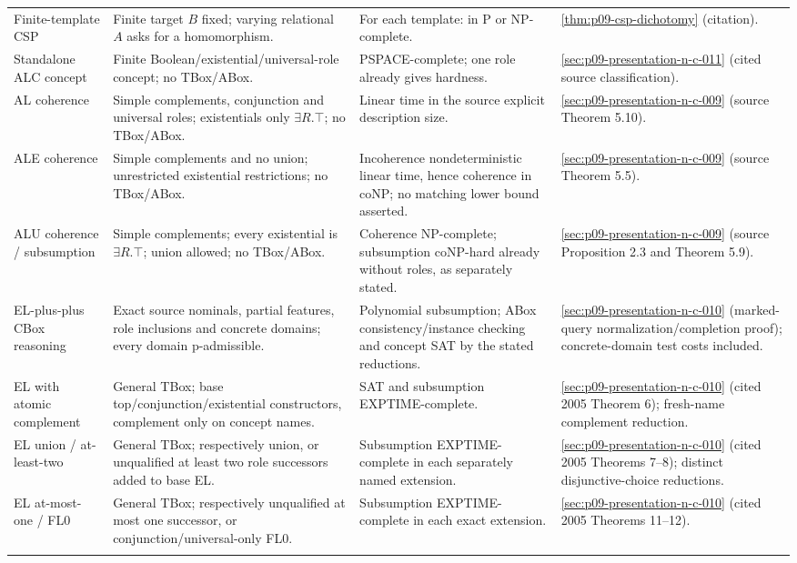 \begin{landscape}
\begin{longtable}{@{}p{.18\linewidth}p{.25\linewidth}p{.23\linewidth}p{.26\linewidth}@{}}
Finite-template CSP & Finite target \(B\) fixed; varying relational \(A\) asks for a homomorphism. & For each template: in P or NP-complete. & \cref{thm:p09-csp-dichotomy} (citation).\\\addlinespace
Standalone ALC concept & Finite Boolean/existential/universal-role concept; no TBox/ABox. & PSPACE-complete; one role already gives hardness. & \cref{sec:p09-presentation-n-c-011} (cited source classification).\\\addlinespace
AL coherence & Simple complements, conjunction and universal roles; existentials only \(\exists R.\top\); no TBox/ABox. & Linear time in the source explicit description size. & \cref{sec:p09-presentation-n-c-009} (source Theorem 5.10).\\\addlinespace
ALE coherence & Simple complements and no union; unrestricted existential restrictions; no TBox/ABox. & Incoherence nondeterministic linear time, hence coherence in coNP; no matching lower bound asserted. & \cref{sec:p09-presentation-n-c-009} (source Theorem 5.5).\\\addlinespace
ALU coherence / subsumption & Simple complements; every existential is \(\exists R.\top\); union allowed; no TBox/ABox. & Coherence NP-complete; subsumption coNP-hard already without roles, as separately stated. & \cref{sec:p09-presentation-n-c-009} (source Proposition 2.3 and Theorem 5.9).\\\addlinespace
EL-plus-plus CBox reasoning & Exact source nominals, partial features, role inclusions and concrete domains; every domain p-admissible. & Polynomial subsumption; ABox consistency/instance checking and concept SAT by the stated reductions. & \cref{sec:p09-presentation-n-c-010} (marked-query normalization/completion proof); concrete-domain test costs included.\\\addlinespace
EL with atomic complement & General TBox; base top/conjunction/existential constructors, complement only on concept names. & SAT and subsumption EXPTIME-complete. & \cref{sec:p09-presentation-n-c-010} (cited 2005 Theorem 6); fresh-name complement reduction.\\\addlinespace
EL union / at-least-two & General TBox; respectively union, or unqualified at least two role successors added to base EL. & Subsumption EXPTIME-complete in each separately named extension. & \cref{sec:p09-presentation-n-c-010} (cited 2005 Theorems 7--8); distinct disjunctive-choice reductions.\\\addlinespace
EL at-most-one / FL0 & General TBox; respectively unqualified at most one successor, or conjunction/universal-only FL0. & Subsumption EXPTIME-complete in each exact extension. & \cref{sec:p09-presentation-n-c-010} (cited 2005 Theorems 11--12).\\\addlinespace

\end{longtable}
\end{landscape}
